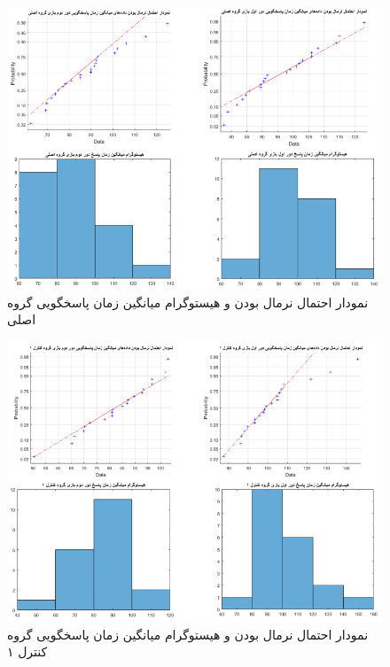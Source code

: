 \documentclass[twoside, a4paper,11pt]{book}
\numberwithin{equation}{chapter}
\numberwithin{table}{chapter}
\numberwithin{figure}{chapter}
\numberwithin{equation}{chapter}
\begin{document}
\begin{figure}
\centering
\includegraphics[scale=0.5]{Figures/p1tNorm.png}
\caption{\label{fig:p1tNorm}
نمودار احتمال نرمال بودن و هیستوگرام میانگین زمان پاسخگویی گروه اصلی
}
\end{figure}

\begin{figure}
\centering
\includegraphics[scale=0.5]{Figures/p2tNorm.png}
\caption{\label{fig:p2tNorm}
نمودار احتمال نرمال بودن و هیستوگرام میانگین زمان پاسخگویی گروه کنترل ۱
}
\end{figure}
\end{document}
